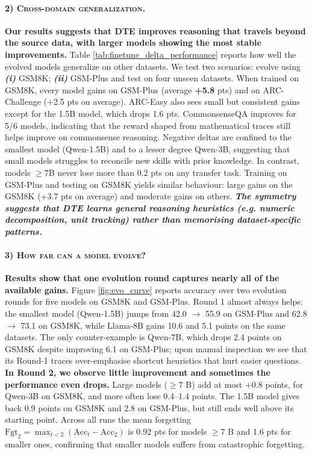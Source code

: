 \documentclass[11pt]{article}
\begin{document}
\paragraph{\textsc{2) Cross-domain generalization.}} \textbf{Our results suggests that DTE improves reasoning that travels beyond the source data, with larger models showing the most stable improvements.} Table \ref{tab:finetune_delta_performance} reports how well the evolved models generalize on other datasets. We test two scenarios: evolve using \textbf{\textit{(i)}} GSM8K; \textbf{\textit{(ii)}} GSM-Plus and test on four unseen datasets. When trained on GSM8K, every model gains on GSM-Plus (average \textbf{+5.8} pts) and on ARC-Challenge (+2.5 pts on average). ARC-Easy also sees small but consistent gains except for the 1.5B model, which drops 1.6 pts. CommonsenseQA improves for 5/6 models, indicating that the reward shaped from mathematical traces still helps improve on commonsense reasoning. Negative deltas are confined to the smallest model (Qwen-1.5B) and to a lesser degree Qwen-3B, suggesting that small models struggles to reconcile new skills with prior knowledge. In contrast, models $\geq7$B never lose more than 0.2 pts on any transfer task. Training on GSM-Plus and testing on GSM8K yields similar behaviour: large gains on the GSM8K (+3.7 pts on average) and moderate gains on others. \textbf{\textit{The symmetry suggests that DTE learns general reasoning heuristics (e.g. numeric decomposition, unit tracking) rather than memorising dataset-specific patterns.}}


\paragraph{\textsc{3) How far can a model evolve?}} \textbf{Results show that one evolution round captures nearly all of the available gains.} Figure \ref{fig:evo_curve} reports accuracy over two evolution rounds for five models on GSM8K and GSM-Plus. Round 1 almost always helps: the smallest model (Qwen-1.5B) jumps from 42.0 $\rightarrow$ 55.9 on GSM-Plus and 62.8 $\rightarrow$ 73.1 on GSM8K, while Llama-8B gains 10.6 and 5.1 points on the same datasets. The only counter-example is Qwen-7B, which drops 2.4 points on GSM8K despite improving 6.1 on GSM-Plus; upon manual inspection we see that its Round-1 traces over-emphasise shortcut heuristics that hurt easier questions. \textbf{In Round 2, we observe  little improvement and sometimes the performance even drops.} Large models ($\geq7$ B) add at most +0.8 points, for Qwen-3B on GSM8K, and more often lose 0.4–1.4 points. The 1.5B model gives back 0.9 points on GSM8K and 2.8 on GSM-Plus, but still ends well above its starting point. Across all runs the mean forgetting $\text{Fgt}_2=\max_{t<2}(\text{Acc}_t-\text{Acc}_2)$ is 0.92 pts for models $\geq7$ B and 1.6 pts for smaller ones, confirming that smaller models suffers from catastrophic forgetting.
\end{document}
